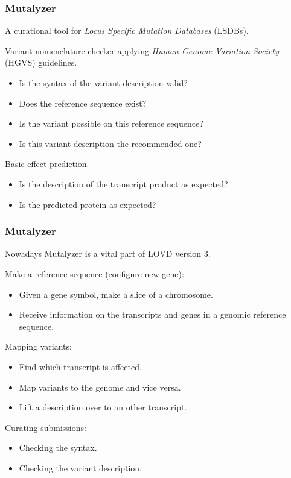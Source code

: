 \documentclass[slidestop]{beamer}
\begin{document}
\begin{frame}
  \frametitle{Mutalyzer}
  
  A curational tool for \emph{Locus Specific Mutation Databases} (LSDBs).
  \pause
  \bigskip

  Variant nomenclature checker applying \emph{Human Genome Variation Society}
  (HGVS) guidelines.
  \begin{itemize}
    \item Is the syntax of the variant description valid?
    \item Does the reference sequence exist?
    \item Is the variant possible on this reference sequence?
    \item Is this variant description the recommended one?
  \end{itemize}
  \bigskip
  \pause

  Basic effect prediction.
  \begin{itemize}
    \item Is the description of the transcript product as expected?
    \item Is the predicted protein as expected?
  \end{itemize}
\end{frame}

\begin{frame}
  \frametitle{Mutalyzer}

  Nowadays Mutalyzer is a vital part of LOVD version 3.
  \bigskip
  \pause

  Make a reference sequence (configure new gene):
  \begin{itemize}
    \item Given a gene symbol, make a slice of a chromosome.
    \item Receive information on the transcripts and genes in a genomic
      reference sequence.
  \end{itemize}
  \medskip
  \pause

  Mapping variants:
  \begin{itemize}
    \item Find which transcript is affected.
    \item Map variants to the genome and vice versa.
    \item Lift a description over to an other transcript.
  \end{itemize}
  \medskip
  \pause

  Curating submissions:
  \begin{itemize}
    \item Checking the syntax.
    \item Checking the variant description.
  \end{itemize}
\end{frame}
\end{document}
